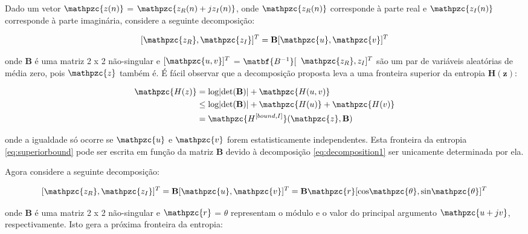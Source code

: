         Dado um vetor $\mathpzc{z(n)}$ = $\mathpzc{z_R(n) + jz_I(n)}$, onde $\mathpzc{z_R(n)}$ corresponde à parte real e $\mathpzc{z_I(n)}$ corresponde à parte imaginária, considere a seguinte decomposição:
        
        \begin{equation}
        \label{eq:decomposition1}
            [\mathpzc{z_R}, \mathpzc{z_I}]^T =
            \mathbf{B}[\mathpzc{u},\mathpzc{v}]^T
        \end{equation}
        
        onde $\mathbf{B}$ é uma matriz 2 x 2 não-singular e $[\mathpzc{u,v}]^T$ = $\matbf{B^{-1}}[$ $\mathpzc{z_R},{z_I}]^T$ são um par de variáveis aleatórias de média zero, pois $\mathpzc{z}$ também é. É fácil observar que a decomposição proposta leva a uma fronteira superior da entropia $\mathbf{H(z)}$:
        
        \begin{equation}\label{eq:superiorbound}
        \begin{split}
            \mathpzc{H(z)} & =\text{log}|\text{det}(\mathbf{B})| + \mathpzc{H(u,v)} \\
                          & \leq \text{log}|\text{det}(\mathbf{B})| + \mathpzc{H(u)} + \mathpzc{H(v)} \\
                          & = \mathpzc{H^{[bound,I]}}(\mathpzc{z},\mathbf{B})
            \end{split}
        \end{equation}
        
        onde a igualdade só ocorre se $\mathpzc{u}$ e $\mathpzc{v}$ forem estatisticamente independentes. Esta fronteira da entropia \ref{eq:superiorbound} pode ser escrita em função da matriz $\mathbf{B}$ devido à decomposição \ref{eq:decomposition1} ser unicamente determinada por ela.
        
        Agora considere a seguinte decomposição:
        
        \begin{equation}
        \label{eq:decomposition2}
            [\mathpzc{z_R}, \mathpzc{z_I}]^T =
            \mathbf{B}[\mathpzc{u},\mathpzc{v}]^T = \mathbf{B}\mathpzc{r}[\text{cos}\mathpzc{\theta},\text{sin}\mathpzc{\theta}]^T  
        \end{equation}
        
        onde $\mathbf{B}$ é uma matriz 2 x 2 não-singular e $\mathpzc{r}$ = $\theta$ representam o módulo e o valor do principal argumento $\mathpzc{u + jv}$, respectivamente. Isto gera a próxima fronteira da entropia:
        
